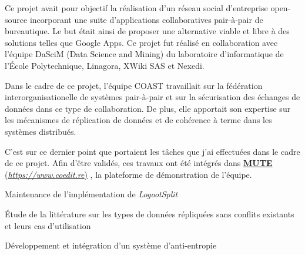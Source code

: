\documentclass[12pt, a4paper]{awesome-cv}
\newcommand{\customlink}[2]{
  \href{#2}{\textbf{#1} (\emph{#2})}
}
\begin{document}
\begin{cventries}
  \begin{cvparagraph}
    Ce projet avait pour objectif la réalisation d'un réseau social d'entreprise open-source incorporant une suite d'applications collaboratives pair-à-pair de bureautique.
    Le but était ainsi de proposer une alternative viable et libre à des solutions telles que Google Apps. Ce projet fut réalisé en collaboration avec l’équipe DaSciM (Data Science and Mining) du laboratoire d’informatique de l’École Polytechnique, Linagora, XWiki SAS et Nexedi.

    Dans le cadre de ce projet, l'équipe COAST travaillait sur la fédération interorganisationelle de systèmes pair-à-pair et sur la sécurisation des échanges de données dans ce type de collaboration. De plus, elle apportait son expertise sur les mécanismes de réplication de données et de cohérence à terme dans les systèmes distribués.

    C'est sur ce dernier point que portaient les tâches que j'ai effectuées dans le cadre de ce projet.
    Afin d'être validés, ces travaux ont été intégrés dans \customlink{MUTE}{https://www.coedit.re}, la plateforme de démonstration de l'équipe.

    \begin{tightemize}
      \item Maintenance de l'implémentation de \emph{LogootSplit}
      \item Étude de la littérature sur les types de données répliquées sans conflits existants et leurs cas d'utilisation
      \item Développement et intégration d'un système d'anti-entropie
    \end{tightemize}

    \begin{description}[labelindent=1.6em,itemsep=-0.3em]
      \item {}
    \end{description}
  \end{cvparagraph}



\end{cventries}
\end{document}
